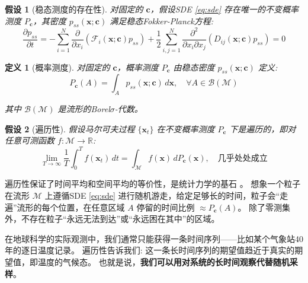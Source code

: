 \documentclass[12pt, a4paper]{article}
\newtheorem{assumption}{假设}[section]
\newtheorem{definition}{定义}[section]
\newcommand{\R}{\mathbb{R}}
\newcommand{\manifold}{\mathcal{M}}
\newcommand{\measure}{P}
\newcommand{\fastvar}{\bm{x}}          %
\newcommand{\slowvar}{\bm{c}}          %
\newcommand{\drift}{\mathcal{F}}  %
\newcommand{\difftensor}{D}       %
\newcommand{\probdens}{p}           %
\newcommand{\borel}{\mathcal{B}}    %
\newcommand{\climind}{f}         %
\begin{document}
\begin{assumption}[稳态测度的存在性]
\label{ass:stationary_measure}
    对固定的 $\slowvar$，假设SDE \eqref{eq:sde} 存在唯一的不变概率测度 $\measure_{\slowvar}$，其密度 $\probdens_{ss}(\fastvar; \slowvar)$ 满足稳态Fokker-Planck方程:
    \begin{equation}
    \label{eq:steady_fp}
        \frac{\partial \probdens_{ss}}{\partial t} = -\sum_{i=1}^N \frac{\partial}{\partial x_i}(\drift_i(\fastvar; \slowvar) \probdens_{ss}) + \frac{1}{2}\sum_{i,j=1}^N \frac{\partial^2}{\partial x_i \partial x_j}(\difftensor_{ij}(\fastvar; \slowvar) \probdens_{ss}) = 0
    \end{equation}
\end{assumption}

\begin{definition}[概率测度]
\label{def:probability_measure}
    对固定的 $\slowvar$，概率测度 $\measure_{\slowvar}$ 由稳态密度 $\probdens_{ss}(\fastvar; \slowvar)$ 定义:
    \begin{equation}
    \label{eq:probability_measure}
        \measure_{\slowvar}(A) = \int_A \probdens_{ss}(\fastvar; \slowvar)\,d\fastvar, \quad \forall A \in \borel(\manifold)
    \end{equation}

    其中 $\borel(\manifold)$ 是流形的Borel$\sigma$-代数。
\end{definition}

\begin{assumption}[遍历性]
\label{ass:ergodicity}
    假设马尔可夫过程 $\{\fastvar_t\}$ 在不变概率测度 $\measure_{\slowvar}$ 下是遍历的，即对任意可测函数 $\climind: \manifold \to \R$:
    \begin{equation}
    \label{eq:ergodic}
        \lim_{T \to \infty} \frac{1}{T}\int_0^T \climind(\fastvar_t)\,dt = \int_{\manifold} \climind(\fastvar)\,d\measure_{\slowvar}(\fastvar), \quad \text{几乎处处成立}
    \end{equation}
\end{assumption}

遍历性保证了时间平均和空间平均的等价性，是统计力学的基石 \cite{eckmann1985ergodic}。
想象一个粒子在流形 $\manifold$ 上遵循SDE \eqref{eq:sde} 进行随机游走，给定足够长的时间，粒子会“走遍”流形的每个位置，在任意区域 $A$ 停留的时间比例 $\approx \measure_{\slowvar}(A)$。
除了零测集外，不存在粒子“永远无法到达”或“永远困在其中”的区域。

在地球科学的实际观测中，我们通常只能获得一条时间序列——比如某个气象站40年的逐日温度记录。
遍历性告诉我们: 这一条长时间序列的期望值趋近于真实的期望值，即温度的气候态。
也就是说，\textbf{我们可以用对系统的长时间观察代替随机采样}。
\end{document}
